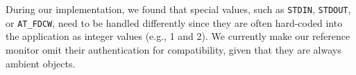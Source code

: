  During our implementation, we found that special \fd values, such as \texttt{STDIN}, \texttt{STDOUT}, or \texttt{AT\_FDCW}, need to be handled differently since they are often hard-coded into the application as integer values (e.g., 1 and 2). We currently make our reference monitor omit their authentication for compatibility, given that they are always ambient objects.









